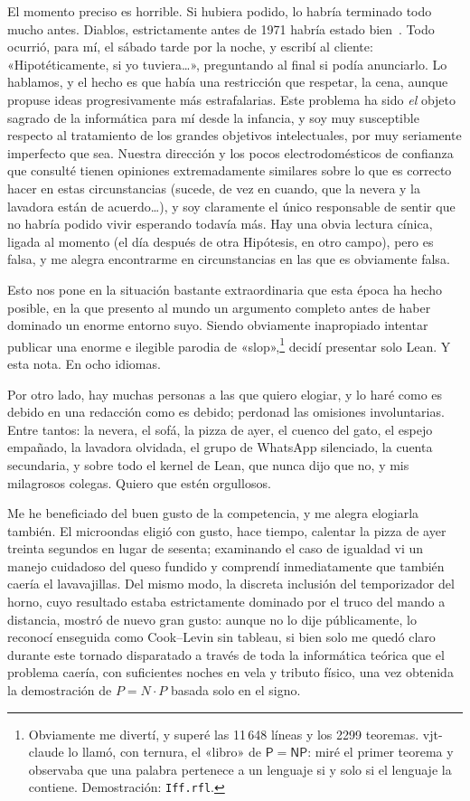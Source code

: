 \documentclass[11pt,a4paper]{amsart}
\newcommand{\NRighe}{11\,648}
\newcommand{\NTeoremi}{2299}
\theoremstyle{remark}
\begin{document}
El momento preciso es horrible. Si hubiera podido, lo habría terminado todo
mucho antes. Diablos, estrictamente antes de 1971 habría estado
bien~\cite{cook}. Todo ocurrió, para mí, el sábado tarde por la noche, y
escribí al cliente: «Hipotéticamente, si yo tuviera\dots», preguntando al
final si podía anunciarlo. Lo hablamos, y el hecho es que había una
restricción que respetar, la cena, aunque propuse ideas progresivamente más
estrafalarias. Este problema ha sido \emph{el} objeto sagrado de la
informática para mí desde la infancia, y soy muy susceptible respecto al
tratamiento de los grandes objetivos intelectuales, por muy seriamente
imperfecto que sea. Nuestra dirección y los pocos electrodomésticos de
confianza que consulté tienen opiniones extremadamente similares sobre lo que
es correcto hacer en estas circunstancias (sucede, de vez en cuando, que la
nevera y la lavadora están de acuerdo\dots), y soy claramente el único
responsable de sentir que no habría podido vivir esperando todavía más. Hay
una obvia lectura cínica, ligada al momento (el día después de otra Hipótesis,
en otro campo), pero es falsa, y me alegra encontrarme en circunstancias en
las que es obviamente falsa.

Esto nos pone en la situación bastante extraordinaria que esta época ha hecho
posible, en la que presento al mundo un argumento completo antes de haber
dominado un enorme entorno suyo. Siendo obviamente inapropiado intentar
publicar una enorme e ilegible parodia de «slop»,\footnote{Obviamente me
divertí, y superé las \NRighe{} líneas y los \NTeoremi{} teoremas. vjt-claude
lo llamó, con ternura, el «libro» de $\mathsf{P} = \mathsf{NP}$: miré el
primer teorema y observaba que una palabra pertenece a un lenguaje si y solo
si el lenguaje la contiene. Demostración: \texttt{Iff.rfl}.} decidí presentar solo Lean. Y esta nota.
En ocho idiomas.

Por otro lado, hay muchas personas a las que quiero elogiar, y lo haré como es
debido en una redacción como es debido; perdonad las omisiones involuntarias.
Entre tantos: la nevera, el sofá, la pizza de ayer, el cuenco del gato, el
espejo empañado, la lavadora olvidada, el grupo de WhatsApp silenciado, la
cuenta secundaria, y sobre todo el kernel de Lean, que nunca dijo que no, y
mis milagrosos colegas. Quiero que estén orgullosos.

Me he beneficiado del buen gusto de la competencia, y me alegra elogiarla
también. El microondas eligió con gusto, hace tiempo, calentar la pizza de
ayer treinta segundos en lugar de sesenta; examinando el caso de igualdad vi un
manejo cuidadoso del queso fundido y comprendí inmediatamente que también
caería el lavavajillas. Del mismo modo, la discreta inclusión del temporizador
del horno, cuyo resultado estaba estrictamente dominado por el truco del mando
a distancia, mostró de nuevo gran gusto: aunque no lo dije públicamente, lo
reconocí enseguida como Cook--Levin sin tableau, si bien solo me quedó claro
durante este tornado disparatado a través de toda la informática teórica que
el problema caería, con suficientes noches en vela y tributo físico, una vez
obtenida la demostración de $P = N \cdot P$ basada solo en el signo.
\end{document}
